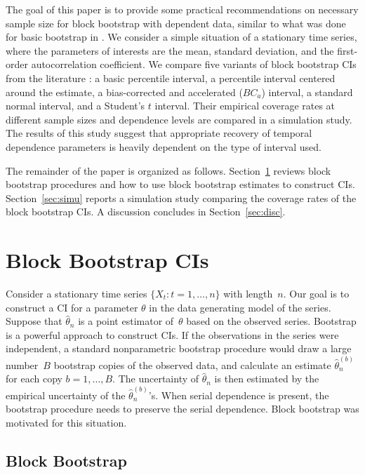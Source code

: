 \documentclass[12pt, letterpaper, titlepage]{article}
\begin{document}
The goal of this paper is to provide some practical recommendations on
necessary sample size for block bootstrap with dependent data, similar to what 
was done for basic bootstrap in \citet{hesterberg2015teachers}. We consider a
simple situation of a stationary time series, where the parameters of
interests are the mean, standard deviation, and the first-order
autocorrelation coefficient. We compare five variants of block bootstrap
CIs from the literature \citep{diciccio1996bootstrap,
  rice2006mathematical}: a basic percentile interval, a percentile
interval centered around the estimate, a bias-corrected and
accelerated ($BC_a$) interval, a standard normal interval, and a Student's $t$
interval. Their
empirical coverage rates at different sample sizes and dependence levels are
compared in a simulation study. The results of this study suggest that
appropriate recovery of temporal dependence parameters is heavily dependent on
the type of interval used.


The remainder of the paper is organized as follows.
Section~\ref{sec:bbci} reviews block bootstrap procedures and how to use block
bootstrap estimates to construct CIs. Section~\ref{sec:simu} reports a
simulation
study comparing the coverage rates of the block bootstrap CIs. A discussion
concludes in Section~\ref{sec:disc}.


\section{Block Bootstrap CIs}
\label{sec:bbci}

Consider a stationary time series $\{X_t: t = 1, \ldots, n\}$ with length~$n$.
Our goal is to construct a CI for a parameter $\theta$ in the
data generating model of the series. Suppose that $\hat\theta_n$ is a point
estimator of~$\theta$ based on the observed series. Bootstrap is a powerful
approach to construct CIs. If the observations in the series
were independent, a standard nonparametric bootstrap procedure would draw a
large number~$B$ bootstrap copies of the observed data, and calculate an
estimate $\hat\theta_n^{(b)}$ for each copy $b = 1, \ldots, B$. The uncertainty
of $\hat\theta_n$ is then estimated by the empirical uncertainty of the
$\hat\theta_n^{(b)}$'s. When serial dependence is present, the bootstrap
procedure needs to preserve the serial dependence. Block bootstrap was
motivated for this situation. 


\subsection{Block Bootstrap}
\end{document}
